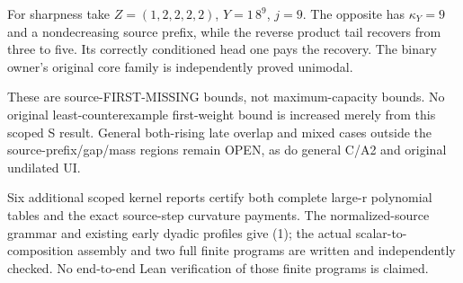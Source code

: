 For sharpness take $Z=(1,2,2,2,2)$, $Y=1\,8^9$, $j=9$.
The opposite has $\kappa_Y=9$ and a nondecreasing source prefix,
while the reverse product tail recovers from three to five.
Its correctly conditioned head one pays the recovery. The binary
owner's original core family is independently proved unimodal.

These are source-FIRST-MISSING bounds, not maximum-capacity
bounds. No original least-counterexample first-weight bound is
increased merely from this scoped S result. General both-rising
late overlap and mixed cases outside the source-prefix/gap/mass
regions remain OPEN, as do general C/A2 and original undilated UI.

Six additional scoped kernel reports certify both complete large-r
polynomial tables and the exact source-step curvature payments.
The normalized-source grammar and existing early dyadic profiles
give (1); the actual scalar-to-composition assembly and two full
finite programs are written and independently checked. No end-to-end
Lean verification of those finite programs is claimed.

